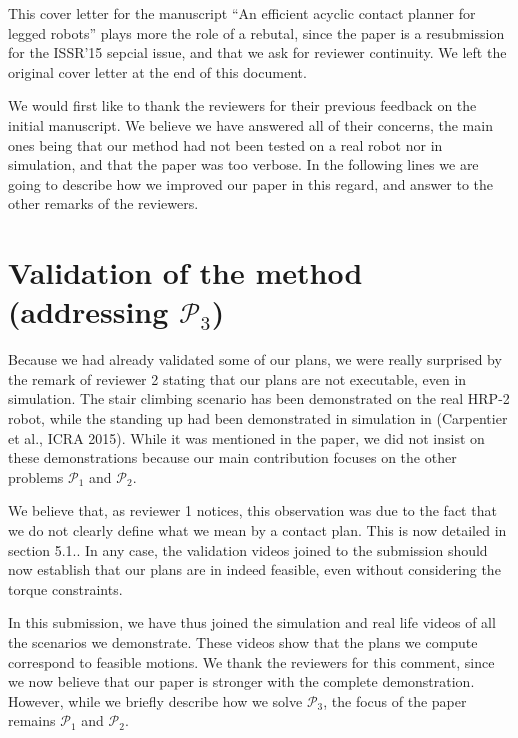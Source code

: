 \documentclass[12pt]{article}
\begin{document}
\maketitle

This cover letter for the manuscript ``An efficient acyclic contact planner for
legged robots'' plays more the role of a rebutal, since the paper is a resubmission for the ISSR'15 sepcial issue, and that we ask for reviewer continuity. We left the original cover
letter at the end of this document.

We would first like to thank the reviewers for their previous feedback on the initial manuscript. We believe we have answered
all of their concerns, the main ones being that our method had not been tested on a real robot nor in simulation, and that the paper was too verbose.
In the following lines we are going to describe how we improved our paper in this regard, and answer to the other remarks of the reviewers.

\section{Validation of the method (addressing  $\mathcal{P}_3$) }
Because we had already validated some of our plans, we were really surprised by the remark of reviewer 2 stating that our plans are not executable, even in simulation.
The stair climbing scenario has been demonstrated
on the real HRP-2 robot, while the standing up had been demonstrated in simulation in (Carpentier et al., ICRA 2015). While it was mentioned in the paper,
we did not insist on these demonstrations because our main contribution focuses on the other problems $\mathcal{P}_1$ and $\mathcal{P}_2$. 

We believe that, as reviewer 1 notices, this observation was due to the fact that we do not clearly define what we mean by a contact plan.
This is now detailed in section 5.1.. In any case, the validation videos joined to the submission should now establish that our plans are in indeed feasible, even without considering
the torque constraints.

In this submission, we have thus joined the simulation and real life videos of all the scenarios we demonstrate.
These videos show that the plans we compute correspond to feasible motions.
We thank the reviewers for this comment,
since we now believe that our paper is stronger with the complete demonstration. However, while we briefly describe how we solve $\mathcal{P}_3$, the focus of the 
paper remains $\mathcal{P}_1$ and $\mathcal{P}_2$.
\end{document}
